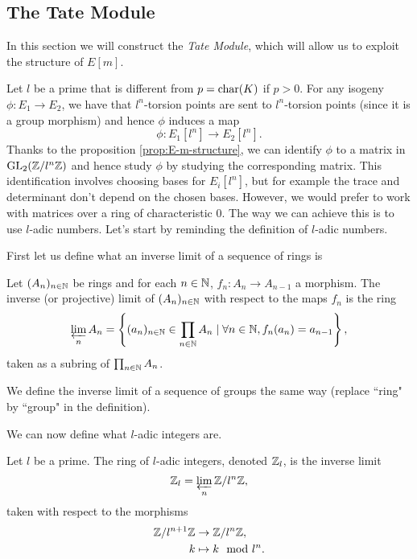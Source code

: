 \subsection{The Tate Module}


In this section we will construct the \emph{Tate Module},
which will allow us to exploit the structure of $E[m]$.

Let $l$ be a prime that is different from $p = \operatorname{char}(K)$ if $p > 0$.
For any isogeny
$\phi: E_1 \to E_2$, we have that $l^n$-torsion points are sent to
$l^n$-torsion points (since it is a group morphism)
and hence $\phi$ induces a map
\begin{equation*}
	\phi: E_1[l^n]\to E_2[l^n].
\end{equation*}
Thanks to the proposition \ref{prop:E-m-structure}, we can identify
$\phi$ to a matrix in $\operatorname{GL}_2(\mathbb{Z}/l^n\mathbb{Z})$ and hence study $\phi$ by studying
the corresponding matrix. This identification involves choosing bases
for $E_i[l^n]$,
but for example the trace and determinant don't depend on the chosen bases.
However, we would prefer to work with matrices over a ring of characteristic
0. The way we can achieve this is to use $l$-adic numbers. Let's start by
reminding the definition of $l$-adic numbers.

First let us define what an inverse limit of a sequence of rings is
\begin{definition}
	Let $(A_n)_{n \in \mathbb{N}}$ be rings and for each $n\in \mathbb{N}$,
	$f_n: A_n \to A_{n-1}$ a morphism. The inverse (or projective)
	limit of $(A_n)_{n\in\mathbb{N}}$
	with respect to the maps $f_n$ is the ring
	\begin{equation*}
		\varprojlim_n A_n = 
		\left\{(a_n)_{n \in \mathbb{N}} \in \prod_{n\in\mathbb{N}}A_n \mid
		\forall n \in \mathbb{N}, f_n(a_n) = a_{n-1} \right\},
	\end{equation*}
	taken as a subring of $\prod_{n\in \mathbb{N}}A_n$.

	We define the inverse limit of a sequence of groups the same way
	(replace ``ring" by ``group" in the definition).
\end{definition}

We can now define what $l$-adic integers are.

\begin{definition}
	Let $l$ be a prime. The ring of $l$-adic integers, denoted $\mathbb{Z}_l$,
	is the inverse limit
	\begin{equation*}
		\mathbb{Z}_l = \varprojlim_n \mathbb{Z}/l^n\mathbb{Z},
	\end{equation*}
	taken with respect to the morphisms
	\begin{align*}
		\mathbb{Z}/l^{n+1}\mathbb{Z} &\to \mathbb{Z}/l^n\mathbb{Z}, \\
		k &\mapsto k \mod l^n.
	\end{align*}
\end{definition}

